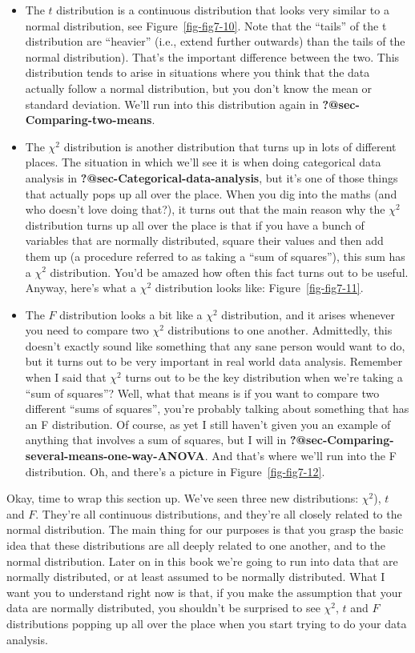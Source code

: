 \documentclass[
  letterpaper,
]{book}
\providecommand{\tightlist}{%
  \setlength{\itemsep}{0pt}\setlength{\parskip}{0pt}}\usepackage{longtable,booktabs,array}
\begin{document}
\begin{itemize}
\tightlist
\item
  The \(t\) distribution is a continuous distribution that looks very
  similar to a normal distribution, see Figure~\ref{fig-fig7-10}. Note
  that the ``tails'' of the t distribution are ``heavier'' (i.e., extend
  further outwards) than the tails of the normal distribution). That's
  the important difference between the two. This distribution tends to
  arise in situations where you think that the data actually follow a
  normal distribution, but you don't know the mean or standard
  deviation. We'll run into this distribution again in
  \textbf{?@sec-Comparing-two-means}.
\item
  The \(\chi^2\) distribution is another distribution that turns up in
  lots of different places. The situation in which we'll see it is when
  doing categorical data analysis in
  \textbf{?@sec-Categorical-data-analysis}, but it's one of those things
  that actually pops up all over the place. When you dig into the maths
  (and who doesn't love doing that?), it turns out that the main reason
  why the \(\chi^2\) distribution turns up all over the place is that if
  you have a bunch of variables that are normally distributed, square
  their values and then add them up (a procedure referred to as taking a
  ``sum of squares''), this sum has a \(\chi^2\) distribution. You'd be
  amazed how often this fact turns out to be useful. Anyway, here's what
  a \(\chi^2\) distribution looks like: Figure~\ref{fig-fig7-11}.
\item
  The \(F\) distribution looks a bit like a \(\chi^2\) distribution, and
  it arises whenever you need to compare two \(\chi^2\) distributions to
  one another. Admittedly, this doesn't exactly sound like something
  that any sane person would want to do, but it turns out to be very
  important in real world data analysis. Remember when I said that
  \(\chi^2\) turns out to be the key distribution when we're taking a
  ``sum of squares''? Well, what that means is if you want to compare
  two different ``sums of squares'', you're probably talking about
  something that has an F distribution. Of course, as yet I still
  haven't given you an example of anything that involves a sum of
  squares, but I will in
  \textbf{?@sec-Comparing-several-means-one-way-ANOVA}. And that's where
  we'll run into the F distribution. Oh, and there's a picture in
  Figure~\ref{fig-fig7-12}.
\end{itemize}

Okay, time to wrap this section up. We've seen three new distributions:
\(\chi^2\)), \(t\) and \(F\). They're all continuous distributions, and
they're all closely related to the normal distribution. The main thing
for our purposes is that you grasp the basic idea that these
distributions are all deeply related to one another, and to the normal
distribution. Later on in this book we're going to run into data that
are normally distributed, or at least assumed to be normally
distributed. What I want you to understand right now is that, if you
make the assumption that your data are normally distributed, you
shouldn't be surprised to see \(\chi^2\), \(t\) and \(F\) distributions
popping up all over the place when you start trying to do your data
analysis.
\end{document}
